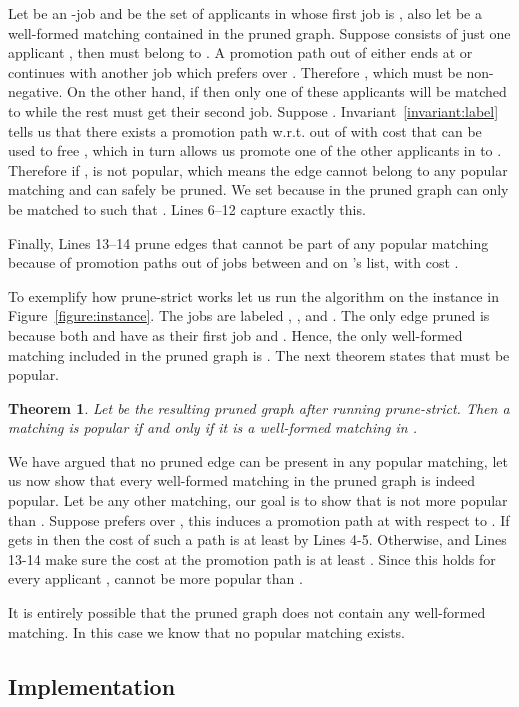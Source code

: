 \documentclass[11pt]{article}
\newcommand{\wrt}{{w.r.t.}\xspace}
\newtheorem{theorem}{Theorem}
\begin{document}
{Let  be an -job and  be the set of applicants in  whose first job is , also let  be a well-formed matching contained in the pruned graph. Suppose  consists of just one applicant , then  must belong to . A promotion path out of  either ends at  or continues with another job which  prefers over . Therefore , which must be non-negative. On the other hand, if  then only one of these applicants will be matched to  while the rest must get their second job. Suppose . Invariant~\ref{invariant:label} tells us that there exists a promotion path \wrt  out of  with cost  that can be used to free , which in turn allows us promote one of the other applicants in  to . Therefore if ,  is not popular, which means the edge  cannot belong to any popular matching and can safely be pruned. We set  because in the pruned graph  can only be matched to  such that . Lines 6--12 capture exactly this.

Finally, Lines 13--14 prune edges  that cannot be part of any popular matching because of promotion paths out of jobs between  and  on 's list, with cost .

To exemplify how {\sc prune-strict} works let us run the algorithm on the instance in Figure~\ref{figure:instance}. The jobs are labeled , , and . The only edge pruned is  because both  and  have  as their first job and . Hence, the only well-formed matching included in the pruned graph is . The next theorem states that  must be popular.

\begin{theorem} Let  be the resulting pruned graph after running {\sc prune-strict}. Then a matching is popular if and only if it is a well-formed matching in .
\end{theorem}

We have argued that no pruned edge can be present in any popular matching, let us now show that every well-formed matching  in the pruned graph is indeed popular. Let  be any other matching, our goal is to show that  is not more popular than . Suppose  prefers  over , this induces a promotion path at  with respect to . If  gets  in  then the cost of such a path is at least  by Lines 4-5. Otherwise,  and Lines 13-14 make sure the cost at the promotion path is at least . Since this holds for every applicant ,  cannot be more popular than . 

It is entirely possible that the pruned graph does not contain any well-formed matching. In this case we know that no popular matching exists.

\subsection{Implementation}

}
\end{document}
